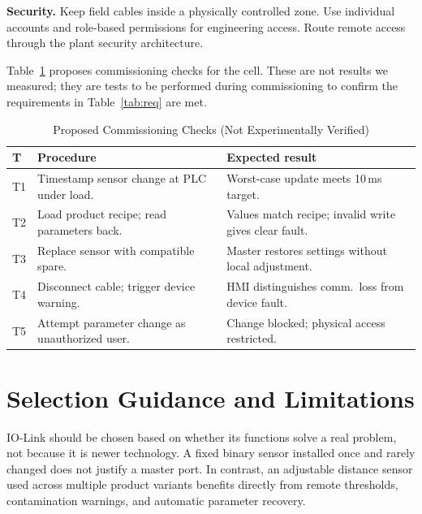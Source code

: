 \documentclass[conference]{IEEEtran}
\begin{document}
\textbf{Security.}
Keep field cables inside a physically controlled zone. Use individual
accounts and role-based permissions for engineering access. Route
remote access through the plant security architecture.

Table~\ref{tab:validation} proposes commissioning checks for the cell.
These are not results we measured; they are tests to be performed
during commissioning to confirm the requirements in
Table~\ref{tab:req} are met.

\begin{table}[!t]
\caption{Proposed Commissioning Checks (Not Experimentally Verified)}
\label{tab:validation}
\renewcommand{\arraystretch}{1.2}
\begin{tabularx}{\columnwidth}{@{}p{0.45cm} p{2.95cm} p{3.2cm}@{}}
\toprule
\textbf{T} & \textbf{Procedure} & \textbf{Expected result} \\
\midrule
T1 & Timestamp sensor change at PLC under load. &
     Worst-case update meets 10\,ms target. \\[2pt]
T2 & Load product recipe; read parameters back. &
     Values match recipe; invalid write gives clear fault. \\[2pt]
T3 & Replace sensor with compatible spare. &
     Master restores settings without local adjustment. \\[2pt]
T4 & Disconnect cable; trigger device warning. &
     HMI distinguishes comm.\ loss from device fault. \\[2pt]
T5 & Attempt parameter change as unauthorized user. &
     Change blocked; physical access restricted. \\
\bottomrule
\end{tabularx}
\end{table}

\section{Selection Guidance and Limitations}
\label{sec:guidance}

IO-Link should be chosen based on whether its functions solve a real
problem, not because it is newer technology. A fixed binary sensor
installed once and rarely changed does not justify a master port. In
contrast, an adjustable distance sensor used across multiple product
variants benefits directly from remote thresholds, contamination
warnings, and automatic parameter recovery.
\end{document}
